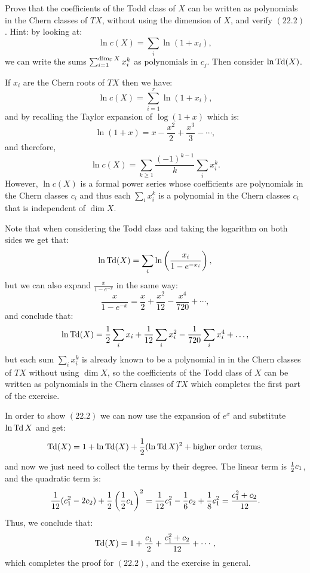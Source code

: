 \documentclass[11pt, a4paper]{article}
\begin{document}
\begin{exercise}
  Prove that the coefficients of the Todd class of $X$ can be written
  as polynomials in the Chern classes of $TX$, without using the dimension
  of $X$, and verify $(22.2)$.
  Hint: by looking at:
  \[
    \ln c(X) = \sum_{i} \ln(1 + x_i),
  \]
  we can write the sums $\sum_{i=1}^{\dim_{\mathbb{C}} X} x_i^k$ as polynomials in $c_j$.
  Then consider $\ln \operatorname{Td}(X)$.
\end{exercise}
\begin{solution}
  If $x_i$ are the Chern roots of $TX$ then we have:
  \[
    \ln c(X) = \sum_{i=1}^{r} \ln(1 + x_i),
  \]
  and by recalling the Taylor expansion of $\log(1 + x)$ which is:
  \[
    \ln(1 + x) = x - \frac{x^2}{2} + \frac{x^3}{3} - \cdots,
  \]
  and therefore,
  \[
    \ln c(X) = \sum_{k \geq 1} \frac{(-1)^{k-1}}{k} \sum_{i} x_i^k.
  \]
  However, $\ln c(X)$ is a formal power series whose coefficients are polynomials
  in the Chern classes $c_i$ and thus each $\sum_{i} x_i^k$ is a polynomial
  in the Chern classes $c_i$ that is independent of $\dim X$.

  Note that when considering the Todd class and taking the logarithm on both
  sides we get that:
  \[
    \ln \Td(X) = \sum_{i} \ln \del{\frac{x_i}{1 - e^{-x_i}}},
  \]
  but we can also expand $\frac{x}{1 - e^{-x}}$ in the same way:
  \[
    \frac{x}{1 - e^{-x}} = \frac{x}{2} + \frac{x^2}{12} - \frac{x^4}{720}
    + \cdots,
  \]
  and conclude that:
  \[
    \ln \operatorname{Td}(X) = \frac{1}{2} \sum_{i} x_i + \frac{1}{12} \sum_{i} x_i^2
      - \frac{1}{720} \sum_{i} x_i^4 + \dots,
  \]
  but each sum $\sum_{i} x_i^k$ is already known to be a polynomial in
  in the Chern classes of $TX$ without using $\dim X$,
  so the coefficients of the Todd class of $X$ can be written
  as polynomials in the Chern classes of $TX$ which completes
  the first part of the exercise.

  In order to show $(22.2)$ we can now use the expansion of $e^x$
  and substitute $\ln \operatorname{Td} X$ and get:
  \[
    \operatorname{Td}(X) = 1 + \ln \operatorname{Td}(X) + \frac{1}{2} (\ln \operatorname{Td} X)^2 + \text{higher order terms},
  \]
  and now we just need to collect the terms by their degree.
  The linear term is $\frac{1}{2} c_1$, and the quadratic term is:
  \[
    \frac{1}{12} (c_1^2 - 2c_2) + \half \del{\half c_1}^2 =
    \frac{1}{12} c_1^2 - \frac{1}{6} c_2 + \frac{1}{8} c_1^2 =
    \frac{c_1^2 + c_2}{12}.
  \]
  Thus, we conclude that:
  \[
    \operatorname{Td}(X) = 1 + \frac{c_1}{2} + \frac{c_1^2 + c_2}{12} + \cdots,
  \]
  which completes the proof for $(22.2)$,
  and the exercise in general.
\end{solution}
\end{document}
